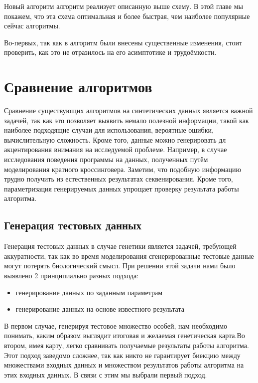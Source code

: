 \documentclass{matmex-diploma-custom}
\begin{document}
Новый алгоритм алгоритм реализует описанную выше схему. В этой главе мы
покажем, что эта схема оптимальная и более быстрая, чем наиболее
популярные сейчас алгоритмы.

Во-первых, так как в алгоритм были внесены существенные изменения,
стоит проверить, как это не отразилось на его асимптотике и
трудоёмкости.

\section{Сравнение алгоритмов}

Сравнение существующих алгоритмов на синтетических данных является
важной задачей, так как это позволяет выявить немало полезной
информации, такой как наиболее подходящие случаи для использования,
вероятные ошибки, вычислительную сложность. Кроме того, данные можно
генерировать дл акцентирования внимания на исследуемой
проблеме. Например, в случае исследования поведения программы на
данных, полученных путём моделирования кратного
кроссинговера. Заметим, что подобную информацию трудно получить из
естественных результатах секвенирования. Кроме того, параметризация
генерируемых данных упрощает проверку результата работы алгоритма.

\subsection{Генерация тестовых данных}

Генерация тестовых данных в случае генетики является задачей,
требующей аккуратности, так как во время моделирования сгенерированные
тестовые данные могут потерять биологический смысл.  При решении
этой задачи нами было выявлено 2 принципиально разных подхода:

\begin{itemize}
\item генерирование данных по заданным параметрам
\item генерирование данных на основе известного результата
\end{itemize}

В первом случае, генерируя тестовое множество особей, нам необходимо
понимать, каким образом выглядит итоговая и желаемая генетическая
карта.Во втором, имея карту, легко сравнивать получаемые результаты
работы алгоритма. Этот подход заведомо сложнее, так как никто не
гарантирует биекцию между множествами входных данных и множеством
результатов работы алгоритма на этих входных данных.  В связи с этим
мы выбрали первый подход.
\end{document}
